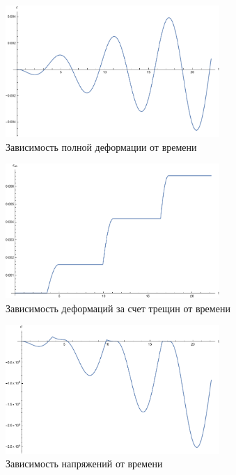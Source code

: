 \documentclass[12pt,a4paper]{article}
\begin{document}
\begin{enumerate}
    \begin{figure}[h]
      \centering
      \includegraphics[width=0.725\textwidth]{T1/h_1_tau_0.05/epsilon(t).pdf}
      \caption{Зависимость полной деформации от времени}
    \end{figure}

    \begin{figure}[h]
      \centering
      \includegraphics[width=0.725\textwidth]{T1/h_1_tau_0.05/epsilon_crk(t).pdf}
      \caption{Зависимость деформаций за счет трещин от времени}
    \end{figure}

    \pagebreak

    \begin{figure}[h]
      \centering
      \includegraphics[width=0.725\textwidth]{T1/h_1_tau_0.05/sigma(t).pdf}
      \caption{Зависимость напряжений от времени}
    \end{figure}


\end{enumerate}
\end{document}
